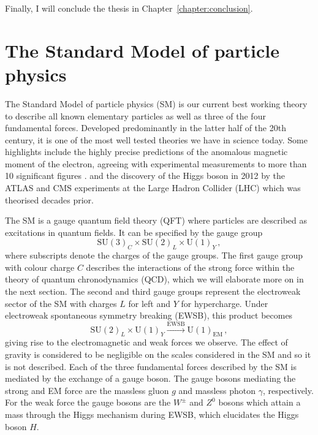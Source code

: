 \documentclass[main.tex]{subfiles}
\begin{document}
Finally, I will conclude the thesis in Chapter~\ref{chapter:conclusion}.

\label{chapter:intro}
\section{The Standard Model of particle physics}
    The Standard Model of particle physics (SM) is our current
    best working theory to describe all known elementary particles
    as well as three of the four fundamental forces. Developed
    predominantly in the latter half of the 20th century, it is
    one of the most well tested theories we have in science today.
    Some highlights include the highly precise predictions of the
    anomalous magnetic moment of the electron, agreeing with experimental
    measurements to more than 10 significant figures \cite{Aoyama:2017uqe}.
    and the discovery of the Higgs boson in 2012 by the ATLAS \cite{ATLAS:2012yve}
    and CMS experiments \cite{CMS:2012qbp} at the Large Hadron Collider
    (LHC) which was theorised decades prior.

    The SM is a gauge quantum field theory (QFT) where particles
    are described as excitations in quantum fields. It can be specified
    by the gauge group
    \begin{equation}\label{eqn:SM_gauge}
        \mathrm{SU}(3)_{C} \times \mathrm{SU}(2)_{L} \times \mathrm{U}(1)_{Y}\, ,
    \end{equation}
    where subscripts denote the charges of the gauge groups. The first gauge
    group with colour charge $C$ describes the interactions of the
    strong force within the theory of quantum chronodynamics (QCD), which we
    will elaborate more on in the next section. The second
    and third gauge groups represent the electroweak sector of the SM with
    charges $L$ for left and $Y$ for hypercharge. Under electroweak
    spontaneous symmetry breaking (EWSB), this product becomes
    \begin{equation}\label{eqn:SM_SSB}
        \mathrm{SU}(2)_{L} \times \mathrm{U}(1)_{Y} \xrightarrow{\mathrm{EWSB}} \mathrm{U}(1)_{\mathrm{EM}} \, ,
    \end{equation}
    giving rise to the electromagnetic and weak forces we observe.
    The effect of gravity is considered to be negligible on the scales
    considered in the SM and so it is not described.
    Each of the three fundamental forces described by the SM is mediated
    by the exchange of a gauge boson. The gauge bosons mediating the strong
    and EM force are the massless gluon $g$ and massless photon $\gamma$,
    respectively. For the weak force the gauge bosons are the $W^{\pm}$
    and $Z^{0}$ bosons which attain a mass through the Higgs mechanism \cite{Englert:1964et,Higgs:1964pj,Guralnik:1964eu}
    during EWSB, which elucidates the Higgs boson $H$.
\end{document}
